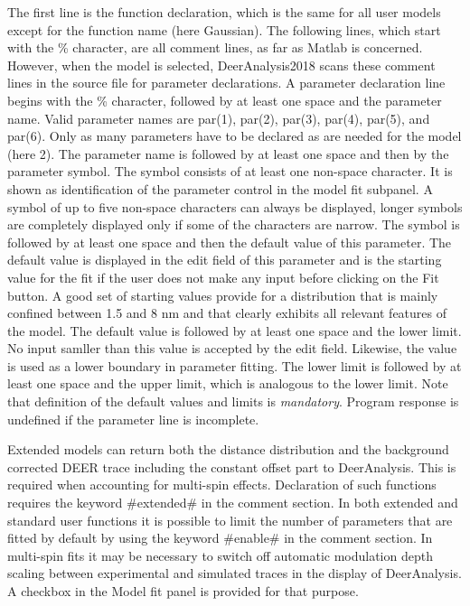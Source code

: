 \documentclass{article}
\begin{document}
The first line is the function declaration, which is the same for all user models except for the function name (here {\ttfamily Gaussian}). The following lines, which start with the \% character, are all comment lines, as far as Matlab is concerned. However, when the model is selected, DeerAnalysis2018 scans these comment lines in the source file for parameter declarations. A parameter declaration line begins with the \% character, followed by at least one space and the parameter name. Valid parameter names are {\ttfamily par(1)}, {\ttfamily par(2)}, {\ttfamily par(3)}, {\ttfamily par(4)}, {\ttfamily par(5)}, and {\ttfamily par(6)}. Only as many parameters have to be declared as are needed for the model (here 2). The parameter name is followed by at least one space and then by the parameter symbol. The symbol consists of at least one non-space character. It is shown as identification of the parameter control in the {\ttfamily model fit} subpanel. A symbol of up to five non-space characters can always be displayed, longer symbols are completely displayed only if some of the characters are narrow. The symbol is followed by at least one space and then the default value of this parameter. The default value is displayed in the edit field of this parameter and is the starting value for the fit if the user does not make any input before clicking on the {\ttfamily Fit} button. A good set of starting values provide for a distribution that is mainly confined between 1.5 and 8 nm and that clearly exhibits all relevant features of the model. The default value is followed by at least one space and the lower limit. No input samller than this value is accepted by the edit field. Likewise, the value is used as a lower boundary in parameter fitting. The lower limit is followed by at least one space and the upper limit, which is analogous to the lower limit. Note that definition of the default values and limits is \emph{mandatory}. Program response is undefined if the parameter line is incomplete.    

Extended models can return both the distance distribution and the background corrected DEER trace including the constant offset part to DeerAnalysis. This is required when accounting for multi-spin effects. Declaration of such functions requires the keyword {\ttfamily \#extended\#} in the comment section. In both extended and standard user functions it is possible to limit the number of parameters that are fitted by default by using the keyword {\ttfamily \#enable\#} in the comment section. In multi-spin fits it may be necessary to switch off automatic modulation depth scaling between experimental and simulated traces in the display of DeerAnalysis. A checkbox in the {\ttfamily Model fit} panel is provided for that purpose.
\end{document}
